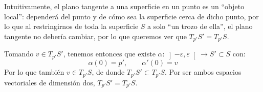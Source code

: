 \begin{ejercicio}
\begin{enumerate}
            Intuitivamente, el plano tangente a una superficie en un punto es un ``objeto local'': dependerá del punto y de cómo sea la superficie cerca de dicho punto, por lo que al restringirnos de toda la superficie $S$ a solo ``un trozo de ella'', el plano tangente no debería cambiar, por lo que queremos ver que $T_{p'}S' = T_{p'}S$.

            Tomando $v\in T_{p'}S'$, tenemos entonces que existe $\alpha:\left]-\varepsilon,\varepsilon\right[\to S'\subset S$ con:
            \begin{equation*}
                \alpha(0) = p',\qquad \alpha'(0) = v
            \end{equation*}
            Por lo que también $v\in T_{p'}S$, de donde $T_{p'}S'\subset T_{p'}S$. Por ser ambos espacios vectoriales de dimensión dos, $T_{p'}S' = T_{p'}S$.
    \end{enumerate}
\end{ejercicio}

